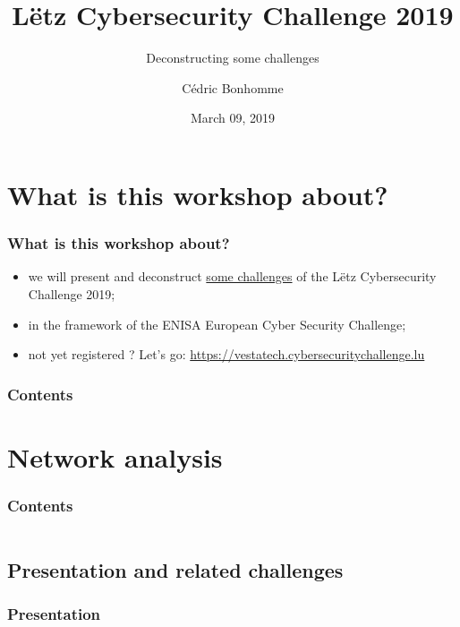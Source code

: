 \documentclass[]{beamer}
\title[Deconstructing some challenges from LCSC 2019]{Lëtz Cybersecurity Challenge 2019}
\subtitle{Deconstructing some challenges}
\author{C\'{e}dric Bonhomme}
\institute[SMILE]{Security Made In Lëtzebuerg}
\date{March 09, 2019}
\begin{document}
\begin{frame}
    \titlepage
\end{frame}


%
%
\section*{What is this workshop about?}
\begin{frame}
    \frametitle{What is this workshop about?}
    \begin{center}
        \begin{itemize}
            \item we will present and deconstruct \href{https://github.com/cscluxembourg/vestatech}{some challenges} of the Lëtz Cybersecurity Challenge 2019;
            \item in the framework of the ENISA European Cyber Security Challenge;
            \item not yet registered ? Let's go: \href{https://vestatech.cybersecuritychallenge.lu}{https://vestatech.cybersecuritychallenge.lu}
        \end{itemize}
    \end{center}
\end{frame}


\begin{frame}
    \frametitle{Contents}
    \tableofcontents
\end{frame}



%
%
\section{Network analysis}
\begin{frame}
    \frametitle{Contents}
    \begin{columns}[t]
        \begin{column}{5cm}
            \tableofcontents[sections={1-2}, currentsection, hideothersubsections]
        \end{column}
        \begin{column}{5cm}
            \tableofcontents[sections={3-4}, currentsection, hideothersubsections]
        \end{column}
    \end{columns}
\end{frame}
\subsection{Presentation and related challenges}
\begin{frame}
\frametitle{Presentation}
\framesubtitle{}

\end{frame}
\end{document}
